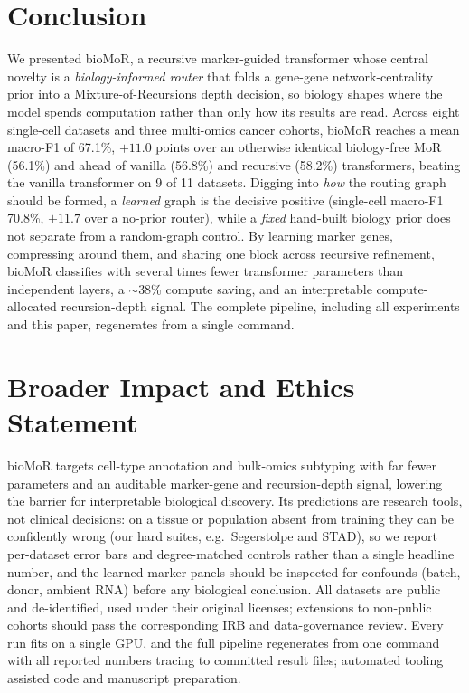 \documentclass[letterpaper]{article}
\begin{document}
\section{Conclusion}
We presented bioMoR, a recursive marker-guided transformer whose central novelty is a
\emph{biology-informed router} that folds a gene-gene network-centrality prior into a
Mixture-of-Recursions depth decision, so biology shapes where the model spends
computation rather than only how its results are read. Across eight single-cell datasets
and three multi-omics cancer cohorts, bioMoR reaches a mean macro-F1 of 67.1\%, $+11.0$
points over an otherwise identical biology-free MoR (56.1\%) and ahead of vanilla (56.8\%)
and recursive (58.2\%) transformers, beating the vanilla transformer on 9 of 11 datasets. Digging into
\emph{how} the routing graph should be formed, a \emph{learned} graph is the decisive
positive (single-cell macro-F1 70.8\%, $+11.7$ over a no-prior router), while a
\emph{fixed} hand-built biology prior does not separate from a random-graph control. By
learning marker genes, compressing around them, and sharing one block across recursive
refinement, bioMoR classifies with several times fewer transformer parameters than
independent layers, a $\sim$38\% compute saving, and an interpretable
compute-allocated recursion-depth signal. The complete pipeline, including
all experiments and this paper, regenerates from a single command.

\section{Broader Impact and Ethics Statement}
bioMoR targets cell-type annotation and bulk-omics subtyping with far fewer parameters and
an auditable marker-gene and recursion-depth signal, lowering the barrier for interpretable
biological discovery. Its predictions are research tools, not clinical decisions: on a
tissue or population absent from training they can be confidently wrong (our hard suites,
e.g.\ Segerstolpe and STAD), so we report per-dataset error bars and degree-matched
controls rather than a single headline number, and the learned marker panels should be
inspected for confounds (batch, donor, ambient RNA) before any biological conclusion. All
datasets are public and de-identified, used under their original licenses; extensions to
non-public cohorts should pass the corresponding IRB and data-governance review. Every run
fits on a single GPU, and the full pipeline regenerates from one command with all reported
numbers tracing to committed result files; automated tooling assisted code and manuscript
preparation.
\end{document}
